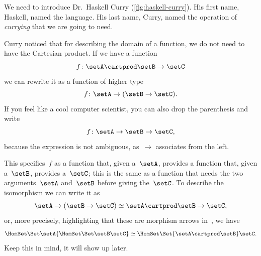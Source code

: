 We need to introduce Dr.~Haskell Curry (\cref{fig:haskell-curry}).
His first name,  Haskell, named the language.
His last name, Curry, named the operation of \emph{currying} that we are going to need.

Curry noticed that for describing the domain of a function, we do not need to have the Cartesian product.
If we have a function
\begin{equation}\label{eq:currying-1}
f \colon \setA \cartprod \setB \to \setC
\end{equation}
we can rewrite it as a function of higher type
\begin{equation}\label{eq:currying-2}
f \colon \setA \to ( \setB \to \setC).
\end{equation}
If you feel like a cool computer scientist, you can also drop the parenthesis and write
\begin{equation}\label{eq:currying-3}
f \colon \setA \to \setB \to \setC,
\end{equation}
because the expression is not ambiguous, as~$\to$ associates from the left.



This specifies~$f$ as a function that, given a~$\setA$, provides a function that, given a~$\setB$, provides a~$\setC$;
this is the same as a function that needs the two arguments~$\setA$ and~$\setB$ before giving the~$\setC$.
To describe the isomorphism we can write it as
\begin{equation}
  \setA \to ( \setB \to \setC) \simeq  \setA \cartprod \setB \to \setC,
\end{equation}
or, more precisely, highlighting that these are morphism arrows in~\Set, we have
\begin{equation}\label{eq:currying-iso-2}
  \HomSet\Set\setA{\HomSet\Set\setB\setC} \simeq \HomSet\Set{\setA \cartprod \setB}\setC.
\end{equation}
Keep this in mind, it will show up later.

